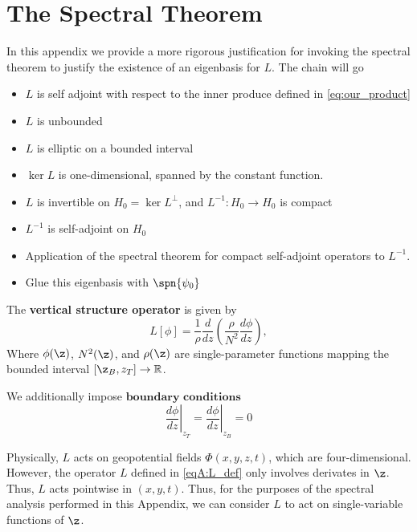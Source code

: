 \section{The Spectral Theorem}
In this appendix we provide a more rigorous justification for invoking the spectral theorem to justify the existence of an eigenbasis for $L$. The chain will go
\begin{itemize}
  \item $L$ is self adjoint with respect to the inner produce defined in \eqref{eq:our_product}
  \item $L$ is unbounded
  \item $L$ is elliptic on a bounded interval
  \item $\ker L$ is one-dimensional, spanned by the constant function.
  \item $L$ is invertible on $H_0 = \ker L ^\perp$, and $L^{-1}:H_0\to H_0$ is compact 
  \item $L^{-1}$ is self-adjoint on $H_0$
  \item Application of the spectral theorem for compact self-adjoint operators to $L^{-1}$. 
  \item Glue this eigenbasis with $\spn\{\psi_0\}$
\end{itemize}
%
\begin{definition}
  The \textbf{vertical structure operator} is given by 
  \begin{equation}
    \label{eqA:L_def}
    L[\phi] = \frac{1}{\rho}\frac{d}{d z}\left(\frac{\rho}{N^2}\frac{d\phi}{d z}\right),
  \end{equation}
  Where $\phi(\z)$, $N^2(\z)$, and $\rho(\z)$ are single-parameter functions mapping the bounded interval $[\z_B, z_T]\to\mathbb{R}$. 
  \par We additionally impose $\textbf{boundary conditions}$
  \begin{equation}
    \left.\frac{d\phi}{d z}\right|_{z_T} = \left.\frac{d\phi}{d z}\right|_{z_B} = 0
  \end{equation}
\end{definition}
%
\begin{remark}
  Physically, $L$ acts on geopotential fields $\Phi(x, y, z, t)$, which are four-dimensional. However, the operator $L$ defined in \eqref{eqA:L_def} only involves derivates in $\z$. Thus, $L$ acts pointwise in $(x, y, t)$. Thus, for the purposes of the spectral analysis performed in this Appendix, we can consider $L$ to act on single-variable functions of $\z$.
\end{remark}
